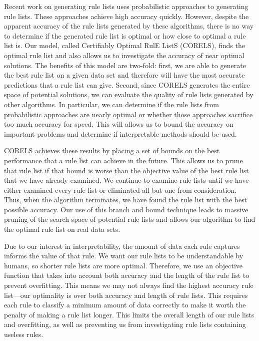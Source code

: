 \documentclass[]{report}
\theoremstyle{definition}
\begin{document}
Recent work on generating rule lists \cite{LethamRuMcMa15,YangRuSe16} uses probabilistic approaches to generating rule lists.
These approaches achieve high accuracy quickly.
However, despite the apparent accuracy of the rule lists generated by these algorithms, there is no way to determine if the generated rule list is optimal or how close to optimal a rule list is. 
Our model, called Certifiably Optimal RulE ListS (CORELS), finds the optimal rule list and also allows us to investigate the accuracy of near optimal solutions. 
The benefits of this model are two-fold: first, we are able to generate the best rule list on a given data set and therefore will have the most accurate predictions that a rule list can give.
Second, since CORELS generates the entire space of potential solutions, we can evaluate the quality of rule lists generated by other algorithms. 
In particular, we can determine if the rule lists from probabilistic approaches are nearly optimal or whether those approaches sacrifice too much accuracy for speed.
This will allows us to bound the accuracy on important problems and determine if interpretable methods should be used.

CORELS achieves these results by placing a set of bounds on the best performance that a rule list can achieve in the future. 
This allows us to prune that rule list if that bound is worse than the objective value of the best rule list that we have already examined.
We continue to examine rule lists until we have either examined every rule list or eliminated all but one from consideration. 
Thus, when the algorithm terminates, we have found the rule list with the best possible accuracy. 
Our use of this branch and bound technique leads to massive pruning of the search space of potential rule lists and allows our algorithm to find the optimal rule list on real data sets.

Due to our interest in interpretability, the amount of data each rule captures informs the value of that rule. 
We want our rule lists to be understandable by humans, so shorter rule lists are more optimal. 
Therefore, we use an objective function that takes into account both accuracy and the length of the rule list to prevent overfitting. 
This means we may not always find the highest accuracy rule list---our optimality is over both accuracy and length of rule lists.
This requires each rule to classify a minimum amount of data correctly to make it worth the penalty of making a rule list longer. 
This limits the overall length of our rule lists and overfitting, as well as preventing us from investigating rule lists containing useless rules.
\end{document}
